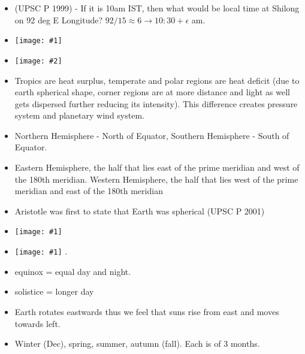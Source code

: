 \documentclass[8pt, a4paper, oneside, twocolumn]{extarticle}
\newcommand{\iph}[2]{
    \texttt{[image: \#2]}
}
\newcommand{\ph}[1]{
    \texttt{[image: \#1]}
}
\begin{document}
\begin{itemize}
\begin{itemize}
    \item Angular distance from standard meridian of a nation to Greenwich meridian time (GMT) give local time, for instance IST = 82.5$^\circ$E meridian $\rightarrow$ ($82.5 * (24/360) = 5.5 \rightarrow$ GMT+5.5 hours).
    \item Although GMT and UTC (Coordinated Universal Time) share the same current time in practice, there is a basic difference between the two:
    1. GMT is a time zone officially used in some European and African countries. 
    2. UTC is not a time zone, but a time standard that is the basis for civil time and time zones worldwide. This means that no country or territory officially uses UTC as a local time.
    \item There is a general understanding among the countries of the world to select the standard meridian in multiples of 7$^\circ$30' of longitude. That is why 82$^\circ$30' E has been selected as the ‘standard meridian’ of India.
  \end{itemize}
  \item (UPSC P 1999) - If it is 10am IST, then what would be local time at Shilong on 92 deg E Longitude? $92/15 \approx 6 \rightarrow 10:30 + \epsilon$ am.
  \item \ph{time}
  \item \iph{0.3}{sub}
  \item Tropics are heat surplus, temperate and polar regions are heat deficit (due to earth spherical shape, corner regions are at more distance and light as well gets dispersed further reducing its intensity). This difference creates pressure system and planetary wind system.
  \item Northern Hemisphere - North of Equator, Southern Hemisphere - South of Equator.
  \item Eastern Hemisphere, the half that lies east of the prime meridian and west of the 180th meridian. Western Hemisphere, the half that lies west of the prime meridian and east of the 180th meridian
  \item Aristotle was first to state that Earth was spherical (UPSC P 2001)
  \item \ph{season}
  \item \ph{sol2}.
  \item equinox = equal day and night.
  \item solistice = longer day
  \item Earth rotates eastwards thus we feel that suns rise from east and moves towards left.
  \item Winter (Dec), spring, summer, autumn (fall). Each is of 3 months.

\end{itemize}
\end{document}
